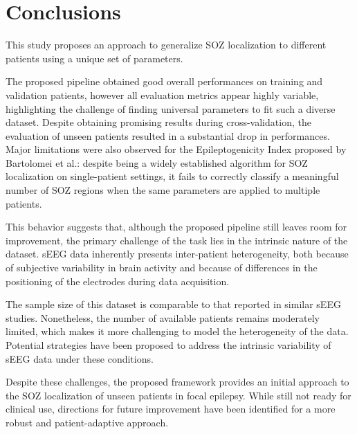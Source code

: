 \pagestyle{fancy}
\fancyhead{}

\fancyheadoffset{0cm}
\renewcommand{\headrulewidth}{1pt} 
\renewcommand{\footrulewidth}{0pt}
\fancyhead[L]{{\thesection}}
\fancyhead[L]{\leftmark}


\section{Conclusions}

This study proposes an approach to generalize SOZ localization to different
patients using a unique set of parameters.

The proposed pipeline obtained good overall performances on training and
validation patients, however all evaluation metrics appear highly variable,
highlighting the challenge of finding universal parameters to fit such a
diverse dataset.
Despite obtaining promising results during cross-validation, the evaluation of
unseen patients resulted in a substantial drop in performances.
Major limitations were also observed for the Epileptogenicity
Index proposed by Bartolomei et al.:
despite being a widely established algorithm for SOZ localization on
single-patient settings, it fails to correctly classify a meaningful 
number of SOZ regions when the same parameters are applied to multiple patients.

This behavior suggests that, although the proposed pipeline still leaves room 
for improvement, the primary challenge of the task lies in the intrinsic nature
of the dataset.
sEEG data inherently presents inter-patient heterogeneity, both because of
subjective variability in brain activity and because of differences in the 
positioning of the electrodes during data acquisition.

The sample size of this dataset is comparable to that reported in similar sEEG 
studies.
Nonetheless, the number of available patients remains moderately limited,
which makes it more challenging to model the heterogeneity of the data.
Potential strategies have been proposed to address the intrinsic variability
of sEEG data under these conditions.

Despite these challenges, the proposed framework provides an initial approach
to the SOZ localization of unseen patients in focal epilepsy.
While still not ready for clinical use, directions for future improvement have
been identified for a more robust and patient-adaptive approach.
